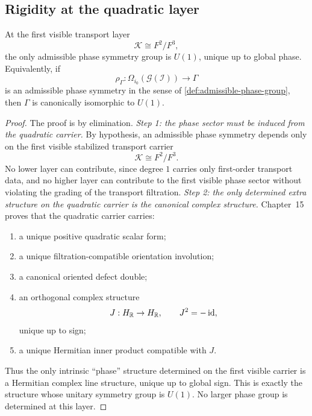 \subsection{Rigidity at the quadratic layer}
\begin{theorem}
	\label{thm:quadratic-phase-rigidity}
	At the first visible transport layer
	\[
		\mathcal K\cong F^2/F^3,
	\]
	the only admissible phase symmetry group is \(U(1)\), unique up to
	global phase.
	Equivalently, if
	\[
		\rho_\Gamma:\Omega_{i_0}(\mathcal G(\mathcal I))\to \Gamma
	\]
	is an admissible phase symmetry in the sense of
	\cref{def:admissible-phase-group}, then \(\Gamma\) is canonically
	isomorphic to \(U(1)\).
\end{theorem}
\begin{proof}
	The proof is by elimination.
	\smallskip
	\noindent\emph{Step 1: the phase sector must be induced from the quadratic carrier.}
	By hypothesis, an admissible phase symmetry depends only on the first
	visible stabilized transport carrier
	\[
		\mathcal K\cong F^2/F^3.
	\]
	No lower layer can contribute, since degree $1$ carries only first-order
	transport data, and no higher layer can contribute to the first visible
	phase sector without violating the grading of the transport filtration.
	\smallskip
	\noindent\emph{Step 2: the only determined extra structure on the quadratic carrier is the
		canonical complex structure.}
	Chapter~15 proves that the quadratic carrier carries:
	\begin{enumerate}
		\item a unique positive quadratic scalar form;
		\item a unique filtration-compatible orientation involution;
		\item a canonical oriented defect double;
		\item an orthogonal complex structure
		      \[
			      J: H_{\mathbb R}\to H_{\mathbb R},\qquad J^2=-\operatorname{id},
		      \]
		      unique up to sign;
		\item a unique Hermitian inner product compatible with $J$.
	\end{enumerate}
	Thus the only intrinsic ``phase'' structure determined on the first visible
	carrier is a Hermitian complex line structure, unique up to global sign.
	This is exactly the structure whose unitary symmetry group is \(U(1)\).
	No larger phase group is determined at this layer. \qedhere
\end{proof}
